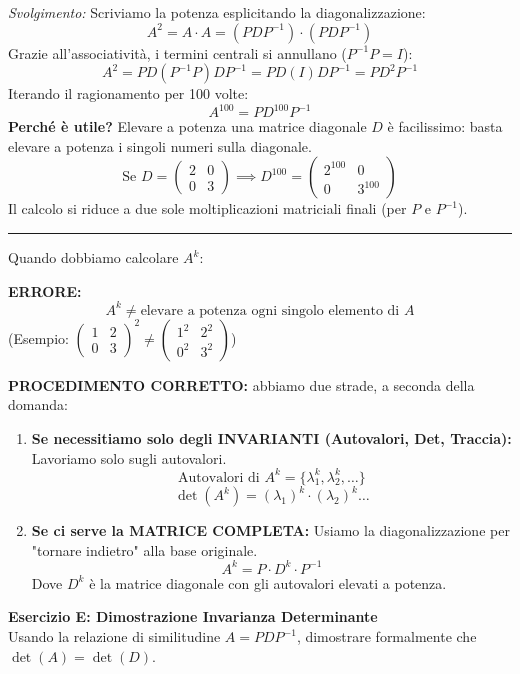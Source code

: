 \documentclass[10pt,a4paper]{article}
\begin{document}
\textit{Svolgimento:}
Scriviamo la potenza esplicitando la diagonalizzazione:
\[ A^2 = A \cdot A = (P D P^{-1}) \cdot (P D P^{-1}) \]
Grazie all'associatività, i termini centrali si annullano ($P^{-1} P = I$):
\[ A^2 = P D (P^{-1} P) D P^{-1} = P D (I) D P^{-1} = P D^2 P^{-1} \]
Iterando il ragionamento per 100 volte:
\[ A^{100} = P D^{100} P^{-1} \]
\textbf{Perché è utile?} Elevare a potenza una matrice diagonale $D$ è facilissimo: basta elevare a potenza i singoli numeri sulla diagonale.
\[ \text{Se } D = \begin{pmatrix} 2 & 0 \\ 0 & 3 \end{pmatrix} \implies D^{100} = \begin{pmatrix} 2^{100} & 0 \\ 0 & 3^{100} \end{pmatrix} \]
Il calcolo si riduce a due sole moltiplicazioni matriciali finali (per $P$ e $P^{-1}$).

\vspace{0.4cm}
\hrule
\vspace{0.4cm}
\vspace{0.3cm}

\begin{tcolorbox}[colback=red!5!white,colframe=red!75!black,title=\textbf]
Quando dobbiamo calcolare $A^k$:

\textbf{ERRORE:}
\[ A^k \neq \text{elevare a potenza ogni singolo elemento di } A \]
(Esempio: $\begin{pmatrix} 1 & 2 \\ 0 & 3 \end{pmatrix}^2 \neq \begin{pmatrix} 1^2 & 2^2 \\ 0^2 & 3^2 \end{pmatrix}$)

\textbf{PROCEDIMENTO CORRETTO:}
abbiamo due strade, a seconda della domanda:
\begin{enumerate}
    \item \textbf{Se necessitiamo solo degli INVARIANTI (Autovalori, Det, Traccia):}
    Lavoriamo solo sugli autovalori.
    \[ \text{Autovalori di } A^k = \{ \lambda_1^k, \lambda_2^k, \dots \} \]
    \[ \det(A^k) = (\lambda_1)^k \cdot (\lambda_2)^k \dots \]

    \item \textbf{Se ci serve la MATRICE COMPLETA:}
    Usiamo la diagonalizzazione per "tornare indietro" alla base originale.
    \[ A^k = P \cdot D^k \cdot P^{-1} \]
    Dove $D^k$ è la matrice diagonale con gli autovalori elevati a potenza.
\end{enumerate}
\end{tcolorbox}
\vspace{0.3cm}
\textbf{Esercizio E: Dimostrazione Invarianza Determinante}
\\ Usando la relazione di similitudine $A = P D P^{-1}$, dimostrare formalmente che $\det(A) = \det(D)$.
\end{document}
